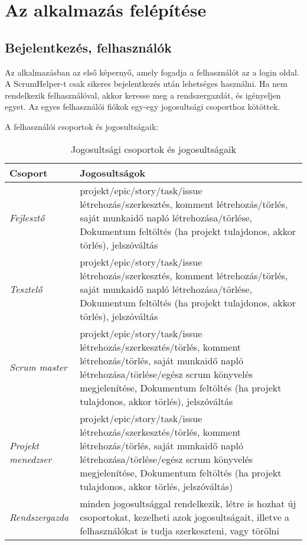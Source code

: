 \newpage

\section{Az alkalmazás felépítése}

\subsection{Bejelentkezés, felhasználók}

Az alkalmazásban az első képernyő, amely fogadja a felhasználót az a login oldal. A ScrumHelper-t csak sikeres bejelentkezés után lehetséges használni. Ha nem rendelkezik felhasználóval, akkor keresse meg a rendszergazdát, és igényeljen egyet. Az egyes felhasználói fiókok egy-egy jogosultsági csoporthoz kötöttek. 

A felhasználói csoportok és jogosultságaik:

\begin{table}[H]
	\centering
	\begin{tabular}{ | m{} | m{} | }
		\hline
		\textbf{Csoport} & \textbf{Jogosultságok} \\
		\hline \hline
		\emph{Fejlesztő} & projekt/epic/story/task/issue létrehozás/szerkesztés, komment létrehozás/törlés, saját munkaidő napló létrehozása/törlése, Dokumentum feltöltés (ha projekt tulajdonos, akkor törlés), jelszóváltás \\
		\hline
		\emph{Tesztelő} &   projekt/epic/story/task/issue létrehozás/szerkesztés, komment létrehozás/törlés, saját munkaidő napló létrehozása/törlése, Dokumentum feltöltés (ha projekt tulajdonos, akkor törlés), jelszóváltás \\
		\hline
		\emph{Scrum master} & projekt/epic/story/task/issue létrehozás/szerkesztés/törlés, komment létrehozás/törlés, saját munkaidő napló létrehozása/törlése/egész scrum könyvelés megjelenítése, Dokumentum feltöltés (ha projekt tulajdonos, akkor törlés), jelszóváltás \\
		\hline
		\emph{Projekt menedzser} & projekt/epic/story/task/issue létrehozás/szerkesztés/törlés, komment létrehozás/törlés, saját munkaidő napló létrehozása/törlése/egész scrum könyvelés megjelenítése, Dokumentum feltöltés (ha projekt tulajdonos, akkor törlés, jelszóváltás) \\
		\hline
		\emph{Rendszergazda} & minden jogosultsággal rendelkezik, létre is hozhat új csoportokat, kezelheti azok jogosultságait, illetve a felhasználókat is tudja szerkeszteni, vagy törölni \\
		\hline
	\end{tabular}
	\caption{Jogosultsági csoportok és jogosultságaik}
	\label{tab:example-1}
\end{table}

